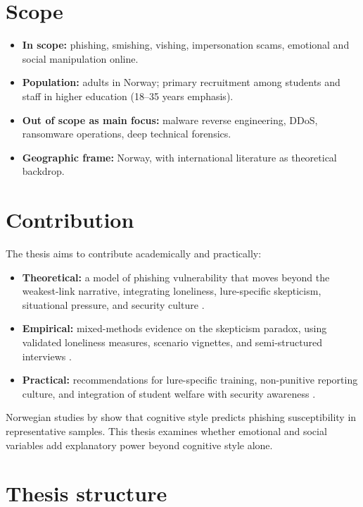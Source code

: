 \documentclass[UKenglish,12pt]{master-style}
\begin{document}
\section{Scope}

\begin{itemize}
    \item \textbf{In scope:} phishing, smishing, vishing, impersonation scams, emotional and social manipulation online.
    \item \textbf{Population:} adults in Norway; primary recruitment among students and staff in higher education (18--35 years emphasis).
    \item \textbf{Out of scope as main focus:} malware reverse engineering, DDoS, ransomware operations, deep technical forensics.
    \item \textbf{Geographic frame:} Norway, with international literature as theoretical backdrop.
\end{itemize}

\section{Contribution}

The thesis aims to contribute academically and practically:

\begin{itemize}
    \item \textbf{Theoretical:} a model of phishing vulnerability that moves beyond the weakest-link narrative, integrating loneliness, lure-specific skepticism, situational pressure, and security culture \parencite{rogers1975pmt,floyd2000pmt}.
    \item \textbf{Empirical:} mixed-methods evidence on the skepticism paradox, using validated loneliness measures, scenario vignettes, and semi-structured interviews \parencite{braun2006thematic}.
    \item \textbf{Practical:} recommendations for lure-specific training, non-punitive reporting culture, and integration of student welfare with security awareness \parencite{chen2024roleplaying,oslomet2024lunsjvenn}.
\end{itemize}

Norwegian studies by \textcite{tjostheim2020phishing,tjostheim2022crt} show that cognitive style predicts phishing susceptibility in representative samples. This thesis examines whether emotional and social variables add explanatory power beyond cognitive style alone.

\section{Thesis structure}
\end{document}
